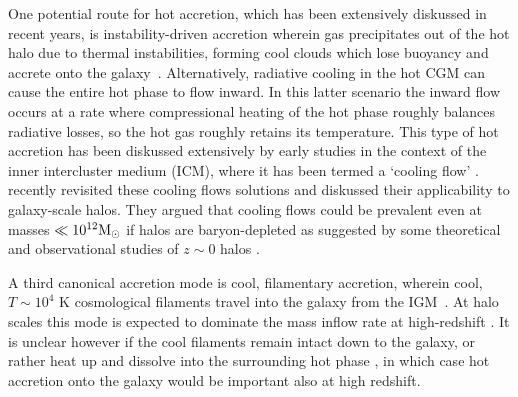 \documentclass[fleqn,usenatbib]{mnras}
\newcommand{\msun}{{\rm M}_\odot}
\begin{document}
One potential route for hot accretion, which has been extensively diskussed in recent years, is instability-driven accretion wherein gas precipitates out of the hot halo due to thermal instabilities, forming cool clouds which lose buoyancy and accrete onto the galaxy~\citep[e.g.][]{Maller2004, Mccourt2012, Voit2015, Armillotta2016, Gronke2019a, Voit2021}.
Alternatively, radiative cooling in the hot CGM can cause the entire hot phase to flow inward.
In this latter scenario the inward flow occurs at a rate where compressional heating of the hot phase roughly balances radiative losses, so the hot gas roughly retains its temperature.
This type of hot accretion has been diskussed extensively by early studies in the context of the inner intercluster medium (ICM), where it has been termed a `cooling flow' \citep[][see \citealt{McNamara2007} for a review]{Mathews78, Cowie80, Fabian84, balbus88, Bertschinger1989}. \cite{Stern2019, Stern2020a} recently revisited these cooling flows solutions and diskussed  their applicability to galaxy-scale halos.
They argued that cooling flows could be prevalent even at masses $\ll10^{12}\msun$ if halos are baryon-depleted as suggested by some theoretical and observational studies of $z\sim0$ halos \citep[e.g.,][]{Bregman2018, Hafen2019}. 

A third canonical accretion mode is cool, filamentary accretion, wherein cool, $T \sim 10^4$ K cosmological filaments travel into the galaxy from the IGM~\cite[e.g.][]{Keres2005, Dekel2006, Keres2009, Martin2019a}. At halo scales this mode is expected to dominate the mass inflow rate at high-redshift \citep[$z\gtrsim2$, e.g.][]{Keres2009a, Dekel2009, Huscher2020}. It is unclear however if the cool filaments remain intact down to the galaxy, or rather heat up and dissolve into the surrounding hot phase \citep{Nelson2016, Mandelker+}, in which case hot accretion onto the galaxy would be important also at high redshift. 


\end{document}
